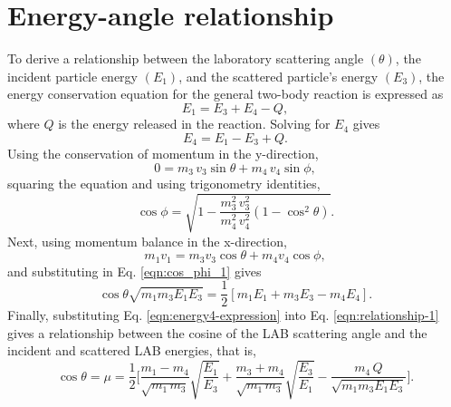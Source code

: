 \documentclass[../main.tex]{subfiles}
\begin{document}
\section{Energy-angle relationship}
To derive a relationship between the laboratory scattering angle $(\theta)$, the incident particle energy $(E_1)$, and the scattered particle's energy $(E_3)$, the energy conservation equation for the general two-body reaction is expressed as
\begin{equation}
  E_{1} = E_{3} + E_{4} - Q,
\end{equation}
where $Q$ is the energy released in the reaction. Solving for $E_{4}$ gives
\begin{equation} \label{eqn:energy4-expression}
  E_{4} = E_{1} - E_{3} + Q.
\end{equation}
Using the conservation of momentum in the y-direction,
\begin{equation}
  0 = m_{3} \, v_{3} \sin \theta + m_{4} \, v_{4} \sin \phi,
\end{equation}
squaring the equation and using trigonometry identities,
\begin{equation} \label{eqn:cos_phi_1}
  \cos \phi = \sqrt{1 - \dfrac{m_{3}^2 \, v_{3}^2}{m_{4}^2 \, v_{4}^2} (1 - \cos^2 \theta)}.
\end{equation}
Next, using momentum balance in the x-direction,
\begin{equation}
  m_{1} v_{1} = m_{3} v_{3} \cos \theta + m_{4} v_{4} \cos \phi,
\end{equation}
and substituting in Eq. \eqref{eqn:cos_phi_1} gives
\begin{equation} \label{eqn:relationship-1}
  \cos \theta \sqrt{m_{1} m_{3} E_{1} E_{3}} =  \dfrac{1}{2} \left[m_{1} E_{1} + m_{3} E_{3} - m_{4} E_{4}\right].
\end{equation}
Finally, substituting Eq. \eqref{eqn:energy4-expression} into Eq. \eqref{eqn:relationship-1} gives a relationship between the cosine of the LAB scattering angle and the incident and scattered LAB energies, that is,
\begin{equation} \label{eqn:two-body-kinematics}
  \cos \theta = \mu = \dfrac{1}{2} \Bigg[\frac{m_{1} - m_{4}}{\sqrt{m_{1} \, m_{3}}}\sqrt{\dfrac{E_{1}}{E_{3}}} + \frac{m_{3} + m_{4}}{\sqrt{m_{1} \, m_{3}}}\sqrt{\dfrac{E_{3}}{E_{1}}} - \dfrac{m_{4} \, Q}{\sqrt{m_{1} m_{3} E_{1} E_{3}}}\Bigg].
\end{equation}
\end{document}
